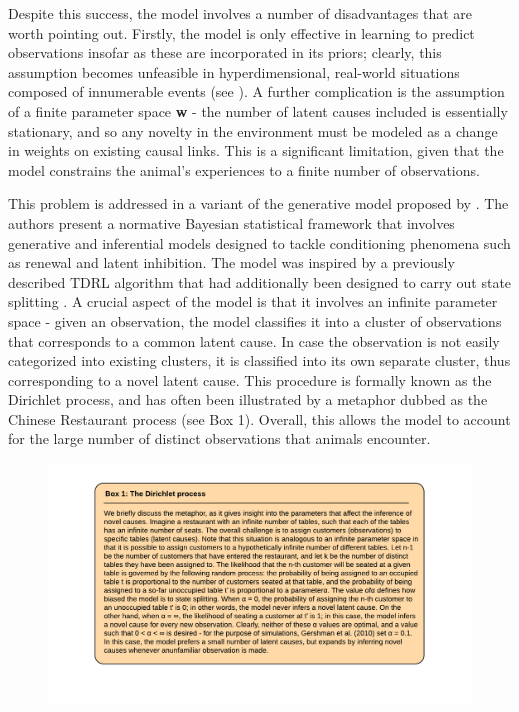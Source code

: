 \documentclass[11pt]{article}
\let\cite=\citep
\let\citeN=\citet
\let\citeNP=\citealt
\begin{document}
Despite this success, the model involves a number of disadvantages that are 
worth pointing out. Firstly, the model is only effective in learning to predict 
observations insofar as these are incorporated in its priors; clearly, this 
assumption becomes unfeasible in hyperdimensional, real-world situations 
composed of innumerable events (see \citeNP{Gershman2010a}). A further 
complication is the assumption of a finite parameter space \textbf{w} - the 
number of latent causes included is essentially stationary, and so any novelty 
in the environment must be modeled as a change in weights on existing causal 
links. This is a significant limitation, given that the model constrains the 
animal's experiences to a finite number of observations.

This problem is addressed in a variant of the generative model proposed by 
\citeN{Gershman2010b}. The authors present a normative Bayesian statistical 
framework that involves generative and inferential models designed to tackle 
conditioning phenomena such as renewal and latent inhibition. The model was 
inspired by a previously described TDRL algorithm that had additionally been 
designed to carry out state splitting \cite{Redish2007}. A crucial aspect of 
the \citeN{Gershman2010b} model is that it involves an infinite parameter space 
- given an observation, the model classifies it into a cluster of observations 
that corresponds to a common latent cause. In case the observation is not 
easily categorized into existing clusters, it is classified into its own 
separate cluster, thus corresponding to a novel latent cause. This procedure is 
formally known as the Dirichlet process, and has often been illustrated by a 
metaphor dubbed as the Chinese Restaurant process (see Box 1). Overall, this 
allows the model to account for the large number of distinct observations that 
animals encounter.

\begin{figure}[h]
\centering
\includegraphics[width=\textwidth]{Figures/Box1}
\label{fig:dirichlet}
\end{figure}
\end{document}
